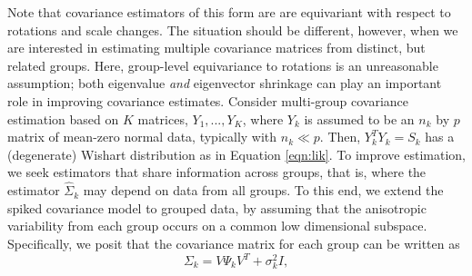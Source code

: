 \documentclass[12pt]{article}
\begin{document}
Note that covariance estimators of this form are are equivariant with
respect to rotations and scale changes.  The situation should be
different, however, when we are interested in estimating multiple
covariance matrices from distinct, but related groups.  Here,
group-level equivariance to rotations is an unreasonable assumption;
both eigenvalue \emph{and} eigenvector shrinkage can play an important
role in improving covariance estimates.  Consider multi-group
covariance estimation based on $K$ matrices, $Y_1, ..., Y_K$, where
$Y_k$ is assumed to be an $n_k$ by $p$ matrix of mean-zero normal
data, typically with $n_k \ll p$.  Then, $Y_k^TY_k = S_k$ has a
(degenerate) Wishart distribution as in Equation \ref{eqn:lik}.  To
improve estimation, we seek estimators that share information across
groups, that is, where the estimator $\hat{\Sigma}_k$ may depend on
data from all groups.  To this end, we extend the spiked covariance
model to grouped data, by assuming that the anisotropic variability
from each group occurs on a common low dimensional subspace.
Specifically, we posit that the covariance matrix for each group can
be written as
\begin{equation}
\Sigma_k = V\Psi_kV^T + \sigma^2_kI,
\label{eqn:sspsi}
\end{equation}



\end{document}
